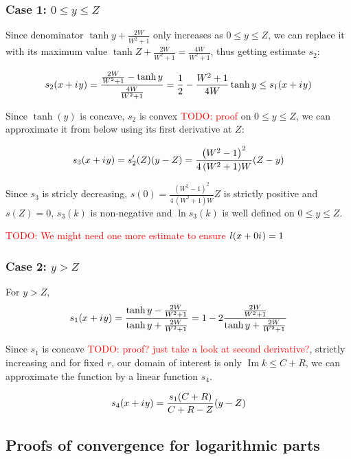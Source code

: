 \documentclass[12pt, a4paper]{article}
\newcommand{\iu}{{i\mkern1mu}}
\renewcommand{\Im}{\operatorname{Im}}
\newcommand{\todo}[1]{{\large \textcolor{red}{TODO: #1}}}
\begin{document}
\subsubsection*{Case 1: $0 \le y \le Z$}
Since denominator $\tanh y + \frac{2 W}{W^2 + 1}$ only increases as $0 \le y \le Z$, we can replace it with its maximum value $\tanh Z + \frac{2 W}{W^2 + 1} = \frac{4 W}{W^2 + 1}$, thus getting estimate $s_2$:

\[
s_2(x + \iu y) = \frac{\frac{2 W}{W^2 + 1} - \tanh y}{\frac{4 W}{W^2 + 1}} = \frac{1}{2} - \frac{W^2 + 1}{4 W} \tanh y \le s_1(x + \iu y)
\]

Since $\tanh(y)$ is concave, $s_2$ is convex \todo{proof} on $0 \le y \le Z$, we can approximate it from below using its first derivative at $Z$:

\[
s_3(x + \iu y) = s_2'(Z)(y - Z) = \frac{{\left(W^{2} - 1\right)}^{2}}{4 \, {\left(W^{2} + 1\right)} W} (Z - y)
\]

Since $s_3$ is stricly decreasing, $s(0) = \frac{{\left(W^{2} - 1\right)}^{2}}{4 \, {\left(W^{2} + 1\right)} W} Z$ is strictly positive and $s(Z) = 0$, $s_3(k)$ is non-negative and $\ln s_3(k)$ is well defined on $0 \le y \le Z$.

\todo{We might need one more estimate to ensure $l(x + 0 \iu) = 1$}


\subsubsection*{Case 2: $y > Z$}
For $y > Z$, 
\[
s_1(x + \iu y) 
 = \frac{\tanh y - \frac{2 W}{W^2 + 1}}{\tanh y + \frac{2 W}{W^2 + 1}}
 = 1 - 2 \frac{\frac{2 W}{W^2 + 1}}{\tanh y + \frac{2 W}{W^2 + 1}}
\]

Since $s_1$ is concave \todo{proof? just take a look at second derivative?}, strictly increasing and for fixed $r$, our domain of interest is only $\Im k \le C + R$, we can approximate the function by a linear function $s_4$.

\[
s_4(x + \iu y) = 
\frac{s_1(C + R)}{C + R - Z} (y - Z)
\]

\subsection*{Proofs of convergence for logarithmic parts}
\end{document}
